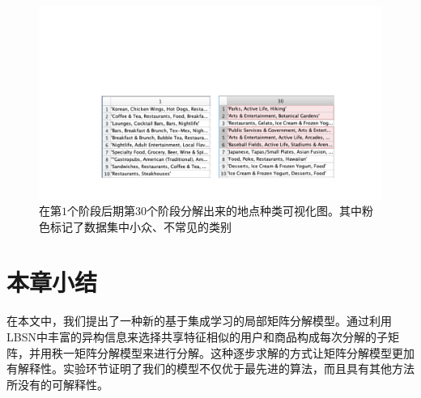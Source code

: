 \begin{figure}[t!]
\centering
\includegraphics[width=\textwidth]{pics/factors.pdf}
\caption{在第$1$个阶段后期第$30$个阶段分解出来的地点种类可视化图。其中粉色标记了数据集中小众、不常见的类别} 
\label{factors}
\end{figure}



\section{本章小结}
\label{conclusion}
在本文中，我们提出了一种新的基于集成学习的局部矩阵分解模型。通过利用LBSN中丰富的异构信息来选择共享特征相似的用户和商品构成每次分解的子矩阵，并用秩一矩阵分解模型来进行分解。这种逐步求解的方式让矩阵分解模型更加有解释性。实验环节证明了我们的模型不仅优于最先进的算法，而且具有其他方法所没有的可解释性。



